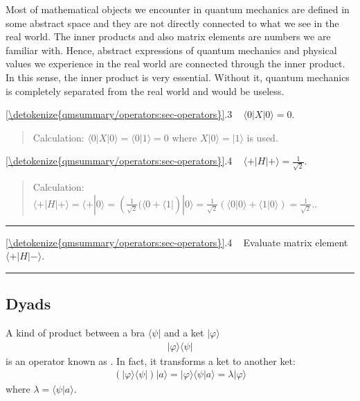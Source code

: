 \documentclass[letterpaper,10pt,english]{jupyterBook}
\begin{document}
\sphinxAtStartPar
Most of mathematical objects we encounter in quantum mechanics are defined in some abstract space and they are not directly connected to what we see in the real world.  The inner products and also matrix elements are numbers we are familiar with.  Hence, abstract expressions of quantum mechanics and physical values we experience in the real world are connected through the inner product.  In this sense, the inner product is very essential.  Without it, quantum mechanics is completely separated from the real world and would be useless.

\sphinxAtStartPar
{} \hyperref[\detokenize{qmsummary/operators:sec-operators}]{\ref{\detokenize{qmsummary/operators:sec-operators}}}.3     \(\langle 0|X| 0 \rangle = 0\).
\begin{quote}

\sphinxAtStartPar
Calculation: \(\langle 0|X| 0 \rangle = \langle 0 | 1 \rangle = 0\) where \(X| 0 \rangle = | 1 \rangle\) is used.
\end{quote}

\sphinxAtStartPar
{} \hyperref[\detokenize{qmsummary/operators:sec-operators}]{\ref{\detokenize{qmsummary/operators:sec-operators}}}.4     \(\langle +|H| + \rangle = \frac{1}{\sqrt{2}}\).
\begin{quote}

\sphinxAtStartPar
Calculation: \(\langle +|H| + \rangle = \langle + | 0 \rangle = \left(\frac{1}{\sqrt{2}}(\langle 0 + \langle 1| \right) | 0 \rangle = \frac{1}{\sqrt{2}} \left(\langle 0|0 \rangle + \langle 1|0 \rangle \right)= \frac{1}{\sqrt{2}}.
\).
\end{quote}


\bigskip\hrule\bigskip


\sphinxAtStartPar
{} \hyperref[\detokenize{qmsummary/operators:sec-operators}]{\ref{\detokenize{qmsummary/operators:sec-operators}}}.4     Evaluate matrix element \(\langle +| H |-\rangle\).


\bigskip\hrule\bigskip



\subsection{Dyads}
\label{\detokenize{qmsummary/operators:dyads}}
\sphinxAtStartPar
A kind of product between a bra \(\langle \psi |\) and a ket \(|\varphi\rangle\)
\begin{equation*}
\begin{split}
|\varphi\rangle\langle \psi |
\end{split}
\end{equation*}
\sphinxAtStartPar
is an operator known as .  In fact, it transforms a ket to another ket:
\begin{equation*}
\begin{split} \left(|\varphi\rangle\langle\psi|\right) |a\rangle = |\varphi\rangle \langle \psi|a \rangle = \lambda |\varphi\rangle
\end{split}
\end{equation*}
\sphinxAtStartPar
where \(\lambda = \langle \psi|a \rangle\).
\end{document}
